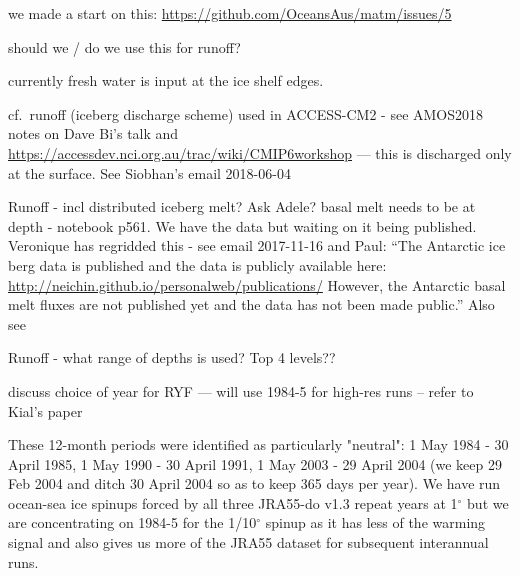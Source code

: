 \documentclass[11pt]{article}
\begin{document}
we made a start on this: \url{https://github.com/OceansAus/matm/issues/5}

should we / do we use this for runoff? \citet{SuzukiYamazakiTsujinoKomuroNakanoUrakawa2017a}

currently fresh water is input at the ice shelf edges.

cf.\ runoff (iceberg discharge scheme) used in ACCESS-CM2 - see AMOS2018 notes on Dave Bi's talk and \url{https://accessdev.nci.org.au/trac/wiki/CMIP6workshop}
--- this is discharged only at the surface.
See Siobhan's email 2018-06-04

Runoff - incl distributed iceberg melt? Ask Adele? basal melt needs to be at depth - notebook p561. We have the data but waiting on it being published. 
Veronique has regridded this - see email 2017-11-16 \citet{MerinoLeSommerDurandJourdainMadecMathiotTournadre2016a} and
\citet{DepoorterBamberGriggsLenaertsLigtenbergBroekeMoholdt2013a}
Paul: ``The Antarctic ice berg data is published and the data is publicly available here: 
\url{http://neichin.github.io/personalweb/publications/}
However, the Antarctic basal melt fluxes are not published yet and the data has not been made public.''
Also see \citet{MerinoJourdainLe-SommerGoosseMathiotDurand2018a, Donat-MagninJourdainSpenceLe-SommerGalleeDurand2017a, MathiotJenkinsHarrisMadec2017a,HammondJones2016a, StosselNotzHaumannHaakJungclausMikolajewicz2015a}

Runoff - what range of depths is used? Top 4 levels??


discuss choice of year for RYF --- will use 1984-5 for high-res runs -- refer to Kial's paper

These 12-month periods were identified as particularly "neutral":
1 May 1984 - 30 April 1985,
1 May 1990 - 30 April 1991,
1 May 2003 - 29 April 2004 (we keep 29 Feb 2004 and ditch 30 April 2004 so as to keep 365 days per year).
We have run ocean-sea ice spinups forced by all three JRA55-do v1.3 repeat years at 1$^\circ$ but we are concentrating on 1984-5 for the 1/10$^\circ$ spinup as it has less of the warming signal and also gives us more of the JRA55 dataset for subsequent interannual runs.
\end{document}
